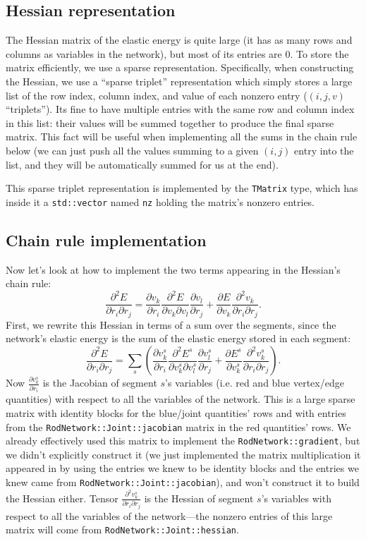 \documentclass[10pt]{article}
\providecommand{\pder}[2]{\frac{\partial #1}{\partial #2}}
\providecommand{\spder}[3]{\frac{\partial^2 #1}{\partial #2 \partial #3}}
\newcommand\pr[1]{\prettyref{#1}}
\begin{document}
\subsection{Hessian representation}
The Hessian matrix of the elastic energy is quite large (it has as many rows and
columns as variables in the network), but most of its entries are 0. To
store the matrix efficiently, we use a sparse representation. Specifically, when constructing
the Hessian, we use a ``sparse triplet'' representation which simply stores
a large list of the row index, column index, and value of each nonzero entry
($(i, j, v)$ ``triplets''). Its fine to have multiple entries with the same row
and column index in this list: their values will be summed together to produce
the final sparse matrix. This fact will be useful when implementing all the
sums in the chain rule \pr{eqn:hessian_chain_rule} below (we can just push all
the values summing to a given $(i, j)$ entry into the list, and they will be
automatically summed for us at the end).

This sparse triplet representation is implemented by the \texttt{TMatrix} type,
which has inside it a \texttt{std::vector} named \texttt{nz} holding the
matrix's nonzero entries.

\subsection{Chain rule implementation}
Now let's look at how to implement the two terms appearing in the Hessian's chain rule:
$$
\spder{E}{r_i}{r_j} =
\pder{v_k}{r_i} \spder{E}{v_k}{v_l} \pder{v_l}{r_j}
+
\pder{E}{v_k} \spder{v_k}{r_i}{r_j}.
$$
First, we rewrite this Hessian in terms of a sum over the segments, since
the network's elastic energy is the sum of the elastic energy stored in each
segment:
\begin{equation}
\label{eqn:hessian_chain_rule}
    \spder{E}{r_i}{r_j} = \sum_s \left(
\pder{v^s_k}{r_i} \spder{E^s}{v^s_k}{v^s_l} \pder{v^s_l}{r_j}
+
\pder{E^s}{v^s_k} \spder{v^s_k}{r_i}{r_j}
    \right).
\end{equation}
Now $\pder{v^s_k}{r_i}$ is the Jacobian of segment $s$'s variables (i.e. red
and blue vertex/edge quantities) with respect to all the variables of the
network. This is a large sparse matrix with identity blocks for
the blue/joint quantities' rows and with entries from the \texttt{RodNetwork::Joint::jacobian}
matrix in the red quantities' rows. We already effectively
used this matrix to implement the \texttt{RodNetwork::gradient},
but we didn't explicitly construct it (we just implemented the matrix
multiplication it appeared in by using the entries we knew to be identity
blocks and the entries we knew came from \texttt{RodNetwork::Joint::jacobian}),
and won't construct it to build the Hessian either.
Tensor $\spder{v^s_k}{r_i}{r_j}$ is the Hessian of segment $s$'s variables
with respect to all the variables of the network---the nonzero
entries of this large matrix will come from \texttt{RodNetwork::Joint::hessian}.
\end{document}
